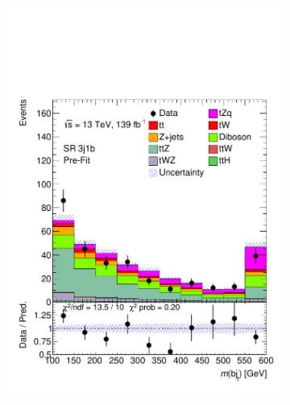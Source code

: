 \begin{figure}[!h]
\begin{subfigure}[b]{0.33\linewidth}
    \includegraphics[width=\textwidth]{ubonn-thesis/Chapters/Chapters_08/appendix/data/SR_3j1b.pdf} 
  \end{subfigure} 
  \begin{subfigure}[b]{0.33\linewidth}
    \centering

\end{subfigure}
\end{figure}
